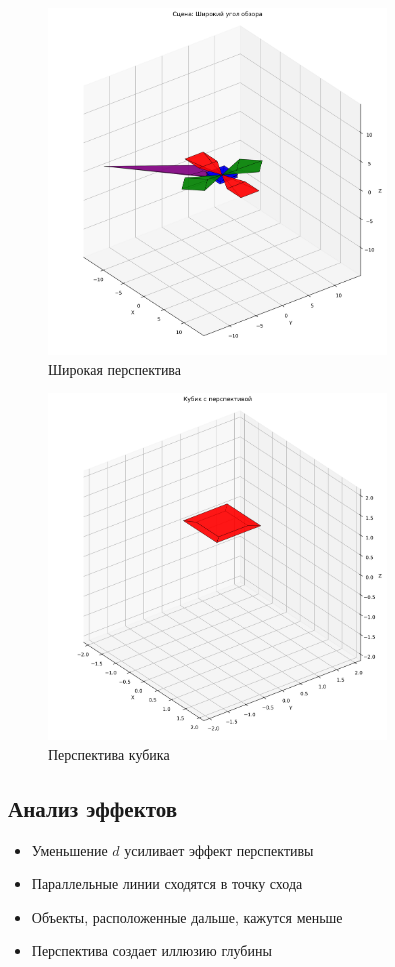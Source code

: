 \begin{figure}[H]
\centering
\includegraphics[width=0.8\textwidth]{images/task7/perspective_wide.png}
\caption{Широкая перспектива}
\end{figure}

\begin{figure}[H]
\centering
\includegraphics[width=0.8\textwidth]{images/task7/perspective_cube.png}
\caption{Перспектива кубика}
\end{figure}

\subsection*{Анализ эффектов}
\begin{itemize}
    \item Уменьшение $d$ усиливает эффект перспективы
    \item Параллельные линии сходятся в точку схода
    \item Объекты, расположенные дальше, кажутся меньше
    \item Перспектива создает иллюзию глубины
\end{itemize}

